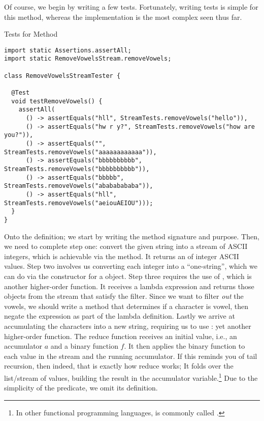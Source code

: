 Of course, we begin by writing a few tests. Fortunately, writing tests is simple for this method, whereas the implementation is the most complex seen thus far.

\begin{cl}[]{Tests for  Method}
\begin{lstlisting}[language=MyJava]
import static Assertions.assertAll;
import static RemoveVowelsStream.removeVowels;

class RemoveVowelsStreamTester {
  
  @Test
  void testRemoveVowels() {
    assertAll(
      () -> assertEquals("hll", StreamTests.removeVowels("hello")),
      () -> assertEquals("hw r y?", StreamTests.removeVowels("how are you?")),
      () -> assertEquals("", StreamTests.removeVowels("aaaaaaaaaaaa")),
      () -> assertEquals("bbbbbbbbbb", StreamTests.removeVowels("bbbbbbbbbb")),
      () -> assertEquals("bbbbb", StreamTests.removeVowels("abababababa")),
      () -> assertEquals("hll", StreamTests.removeVowels("aeiouAEIOU")));
  }
}
\end{lstlisting}
\end{cl}

Onto the definition; we start by writing the method signature and purpose. Then, we need to complete step one: convert the given string into a stream of ASCII integers, which is achievable via the  method. It returns an  of integer ASCII values. Step two involves us converting each integer into a ``one-string'', which we can do via the constructor for a  object. Step three requires the use of , which is another higher-order function. It receives a lambda expression and returns those objects from the stream that satisfy the filter. Since we want to filter \textit{out} the vowels, we should write a method that determines if a character is vowel, then negate the expression as part of the lambda definition. Lastly we arrive at accumulating the characters into a new string, requiring us to use : yet another higher-order function. The reduce function receives an initial value, i.e., an accumulator $a$ and a binary function $f$. It then applies the binary function to each value in the stream and the running accumulator. If this reminds you of tail recursion, then indeed, that is exactly how reduce works; It folds over the list/stream of values, building the result in the accumulator variable.\footnote{In other functional programming languages,  is commonly called .} Due to the simplicity of the  predicate, we omit its definition.

